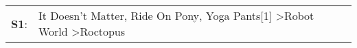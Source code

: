 \begin{supertabular}{p{0.03\textwidth}p{0.92\textwidth}}
 \textbf{S1}:  &  It Doesn't Matter\textsuperscript{}, \enspace Ride On Pony\textsuperscript{}, \enspace Yoga Pants[1]\textsuperscript{} \textgreater \enspace Robot World\textsuperscript{} \textgreater \enspace Roctopus\textsuperscript{}  \enspace  \\
\end{supertabular}
